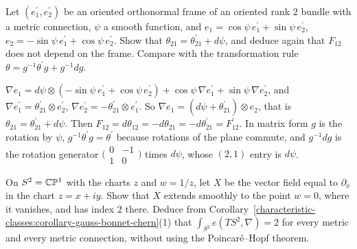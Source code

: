 \begin{exercise}\label{characteristic-classes:exercise-rotation-gauge}
Let $(e^{\prime}_1, e^{\prime}_2)$ be an oriented orthonormal frame of an oriented rank $2$ bundle with a metric connection, $\psi$ a smooth function, and
$e_1 = \cos\psi\,e^{\prime}_1 + \sin\psi\,e^{\prime}_2$, $e_2 = -\sin\psi\,e^{\prime}_1 + \cos\psi\,e^{\prime}_2$. Show that $\theta_{21} = \theta^{\prime}_{21} + d\psi$, and deduce again that $F_{12}$ does not
depend on the frame. Compare with the transformation rule $\theta = g^{-1}\theta^{\prime}g + g^{-1}dg$.
\end{exercise}

\begin{solution}
$\nabla e_1 = d\psi \otimes (-\sin\psi\,e^{\prime}_1 + \cos\psi\,e^{\prime}_2) + \cos\psi\,\nabla e^{\prime}_1 + \sin\psi\,\nabla e^{\prime}_2$, and $\nabla e^{\prime}_1 = \theta^{\prime}_{21} \otimes e^{\prime}_2$,
$\nabla e^{\prime}_2 = -\theta^{\prime}_{21} \otimes e^{\prime}_1$. So $\nabla e_1 = (d\psi + \theta^{\prime}_{21}) \otimes e_2$, that is $\theta_{21} = \theta^{\prime}_{21} + d\psi$. Then
$F_{12} = d\theta_{12} = -d\theta_{21} = -d\theta^{\prime}_{21} = F^{\prime}_{12}$. In matrix form $g$ is the rotation by $\psi$, $g^{-1}\theta^{\prime}g = \theta^{\prime}$ because rotations of the plane commute, and
$g^{-1}dg$ is the rotation generator $\bigl(\begin{smallmatrix} 0 & -1\\ 1 & 0\end{smallmatrix}\bigr)$ times $d\psi$, whose $(2,1)$ entry is $d\psi$.
\end{solution}

\begin{exercise}\label{characteristic-classes:exercise-one-zero-sphere}
On $S^2 = \mathbb{C}\mathbb{P}^1$ with the charts $z$ and $w = 1/z$, let $X$ be the vector field equal to $\partial_x$ in the chart $z = x + iy$. Show that $X$ extends smoothly to the point $w = 0$, where it
vanishes, and has index $2$ there. Deduce from Corollary~\ref{characteristic-classes:corollary-gauss-bonnet-chern}(1) that $\int_{S^2}e(TS^2, \nabla) = 2$ for every metric and every metric
connection, without using the Poincar\'e--Hopf theorem.
\end{exercise}

